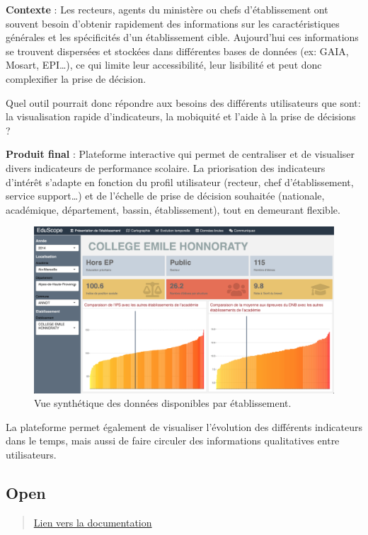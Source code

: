 \documentclass[]{book}
\begin{document}
\textbf{Contexte} : Les recteurs, agents du ministère ou chefs
d'établissement ont souvent besoin d'obtenir rapidement des informations
sur les caractéristiques générales et les spécificités d'un
établissement cible. Aujourd'hui ces informations se trouvent dispersées
et stockées dans différentes bases de données (ex: GAIA, Mosart,
EPI\ldots{}), ce qui limite leur accessibilité, leur lisibilité et peut
donc complexifier la prise de décision.

Quel outil pourrait donc répondre aux besoins des différents
utilisateurs que sont: la visualisation rapide d'indicateurs, la
mobiquité et l'aide à la prise de décisions ?

\textbf{Produit final} : Plateforme interactive qui permet de
centraliser et de visualiser divers indicateurs de performance scolaire.
La priorisation des indicateurs d'intérêt s'adapte en fonction du profil
utilisateur (recteur, chef d'établissement, service support\ldots{}) et
de l'échelle de prise de décision souhaitée (nationale, académique,
département, bassin, établissement), tout en demeurant flexible.

\begin{figure}

{\centering \includegraphics[width=0.6\linewidth]{./img/eduscope} 

}

\caption{Vue synthétique des données disponibles par établissement.}\label{fig:unnamed-chunk-8}
\end{figure}

La plateforme permet également de visualiser l'évolution des différents
indicateurs dans le temps, mais aussi de faire circuler des informations
qualitatives entre utilisateurs.

\subsection{Open}\label{open}

\begin{quote}
\href{http://datavizchallenge.fr/t/defi-n-2-open-placer-la-data-et-les-eleves-au-du-processus-de-decision/89/6}{Lien
vers la documentation}
\end{quote}
\end{document}
